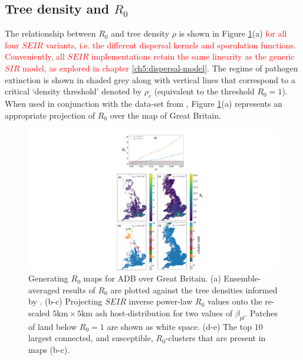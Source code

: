 \subsection{Tree density and $R_0$}

The relationship between $R_0$ and tree density $\rho$ is shown in Figure \ref{fig:R0-map-generation}(a) \textcolor{red}{for all four $SEIR$ variants, i.e. the different dispersal kernels and sporulation functions. Conveniently, all $SEIR$ implementations retain the same linearity as the generic $SIR$ model, as explored in chapter \ref{ch5:dispersal-model}}. The regime of pathogen extinction is shown in shaded grey along with vertical  lines that correspond to a critical `density threshold' denoted by $\rho_c$ (equivalent to the threshold $R_0 = 1$). When used in conjunction with the data-set from \cite{hill.data}, Figure \ref{fig:R0-map-generation}(a) represents an appropriate projection of $R_0$ over the map of Great Britain.

\begin{figure}
    \centering
    \includegraphics[scale=0.55]{chapter6/figures/fig6-R0-map-generation.pdf}
    \caption{Generating $R_0$ maps for ADB over Great Britain. (a) Ensemble-averaged results of $R_0$ are plotted against the tree densities informed by \cite{hill.data}. (b-c) Projecting $SEIR$ inverse power-law $R_0$ values onto the re-scaled $5\mathrm{km} \times 5 \mathrm{km}$ ash host-distribution for two values of $\beta_{pl}$. Patches of land below $R_0 = 1$ are shown as white space. (d-e) The top $10$ largest connected, and susceptible, $R_0$-clusters that are present in maps (b-c).} %
    \label{fig:R0-map-generation}
\end{figure}

